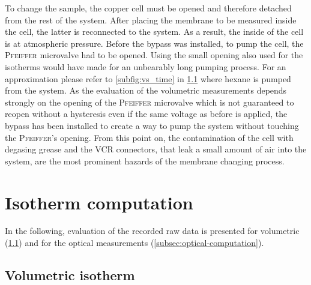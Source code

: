 \documentclass[../thesis.tex]{subfiles}
\begin{document}
        To change the sample, the copper cell must be opened and therefore detached from the rest of the system. After placing the membrane to be measured inside the cell, the latter is reconnected to the system. As a result, the inside of the cell is at atmospheric pressure. Before the bypass was installed, to pump the cell, the \textsc{Pfeiffer} microvalve had to be opened. Using the small opening also used for the isotherms would have made for an unbearably long pumping process. For an approximation please refer to \cref{subfig:vs_time} in \cref{subsec:volumetric-computation} where hexane is pumped from the system. As the evaluation of the volumetric measurements depends strongly on the opening of the \textsc{Pfeiffer} microvalve which is not guaranteed to reopen without a hysteresis even if the same voltage as before is applied, the bypass has been installed to create a way to pump the system without touching the \textsc{Pfeiffer}'s opening. From this point on, the contamination of the cell with degasing grease and the VCR connectors, that leak a small amount of air into the system, are the most prominent hazards of the membrane changing process.



  \section{Isotherm computation}
  \label{sec:isotherm-computation}

    In the following, evaluation of the recorded raw data is presented for volumetric (\cref{subsec:volumetric-computation}) and for the optical measurements (\cref{subsec:optical-computation}).


    \subsection{Volumetric isotherm}
    \label{subsec:volumetric-computation}
\end{document}
